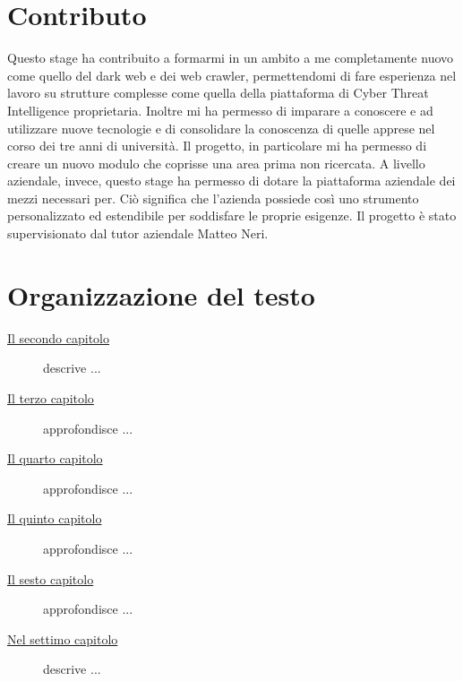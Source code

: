 \section{Contributo}
Questo stage ha contribuito a formarmi in un ambito a me completamente nuovo come quello del dark web e dei web crawler, permettendomi di fare esperienza nel lavoro su strutture complesse come quella della piattaforma di Cyber Threat Intelligence proprietaria. Inoltre mi ha permesso di imparare a conoscere e ad utilizzare nuove tecnologie e di consolidare la conoscenza di quelle apprese nel corso dei tre anni di università.
Il progetto, in particolare mi ha permesso di creare un nuovo modulo che coprisse una area prima non ricercata.
A livello aziendale, invece, questo stage ha permesso di dotare la piattaforma aziendale dei mezzi necessari per. Ciò significa che l’azienda possiede così uno strumento personalizzato ed estendibile per soddisfare le proprie esigenze. \newline{}
Il progetto è stato supervisionato dal tutor aziendale Matteo Neri.

\section{Organizzazione del testo}

\begin{description}
    \item[{\hyperref[cap:processi-metodologie]{Il secondo capitolo}}] descrive ...
    
    \item[{\hyperref[cap:descrizione-stage]{Il terzo capitolo}}] approfondisce ...
    
    \item[{\hyperref[cap:analisi-requisiti]{Il quarto capitolo}}] approfondisce ...
    
    \item[{\hyperref[cap:progettazione-codifica]{Il quinto capitolo}}] approfondisce ...
    
    \item[{\hyperref[cap:verifica-validazione]{Il sesto capitolo}}] approfondisce ...
    
    \item[{\hyperref[cap:conclusioni]{Nel settimo capitolo}}] descrive ...
\end{description}

